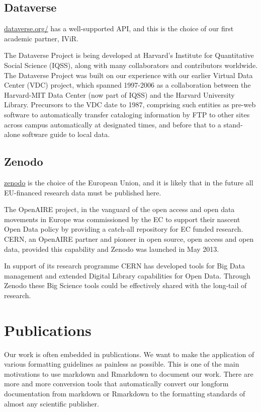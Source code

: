 \documentclass[
  fontsize=13pt,
  english,
  a4paper,
  openany, a4paper, oneside]{book}
\begin{document}
\hypertarget{dataverse}{%
\subsection{Dataverse}\label{dataverse}}

\href{https://dataverse.org/}{dataverse.org/} has a well-supported API, and this is the choice of our first academic partner, IViR.

The Dataverse Project is being developed at Harvard's Institute for Quantitative Social Science (IQSS), along with many collaborators and contributors worldwide. The Dataverse Project was built on our experience with our earlier Virtual Data Center (VDC) project, which spanned 1997-2006 as a collaboration between the Harvard-MIT Data Center (now part of IQSS) and the Harvard University Library. Precursors to the VDC date to 1987, comprising such entities as pre-web software to automatically transfer cataloging information by FTP to other sites across campus automatically at designated times, and before that to a stand-alone software guide to local data.

\hypertarget{zenodo}{%
\subsection{Zenodo}\label{zenodo}}

\href{https://zenodo.org/}{zenodo} is the choice of the European Union, and it is likely that in the future all EU-financed research data must be published here.

The OpenAIRE project, in the vanguard of the open access and open data movements in Europe was commissioned by the EC to support their nascent Open Data policy by providing a catch-all repository for EC funded research. CERN, an OpenAIRE partner and pioneer in open source, open access and open data, provided this capability and Zenodo was launched in May 2013.

In support of its research programme CERN has developed tools for Big Data management and extended Digital Library capabilities for Open Data. Through Zenodo these Big Science tools could be effectively shared with the long-tail of research.

\hypertarget{publications}{%
\section{Publications}\label{publications}}

Our work is often embedded in publications. We want to make the application of various formatting guidelines as painless as possible. This is one of the main motivations to use markdown and Rmarkdown to document our work. There are more and more conversion tools that automatically convert our longform documentation from markdown or Rmarkdown to the formatting standards of almost any scientific publisher.
\end{document}
